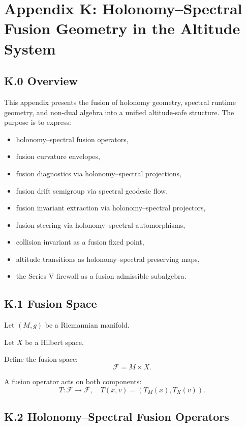 \appendix
\section*{Appendix K: Holonomy–Spectral Fusion Geometry in the Altitude System}

\subsection*{K.0 Overview}

This appendix presents the fusion of holonomy geometry, spectral runtime
geometry, and non-dual algebra into a unified altitude-safe structure.
The purpose is to express:
\begin{itemize}
    \item holonomy–spectral fusion operators,
    \item fusion curvature envelopes,
    \item fusion diagnostics via holonomy–spectral projections,
    \item fusion drift semigroup via spectral geodesic flow,
    \item fusion invariant extraction via holonomy–spectral projectors,
    \item fusion steering via holonomy–spectral automorphisms,
    \item collision invariant as a fusion fixed point,
    \item altitude transitions as holonomy–spectral preserving maps,
    \item the Series V firewall as a fusion admissible subalgebra.
\end{itemize}

\subsection*{K.1 Fusion Space}

Let $(M,g)$ be a Riemannian manifold.

Let $X$ be a Hilbert space.

Define the fusion space:
\[
\mathcal{F} = M \times X.
\]

A fusion operator acts on both components:
\[
T : \mathcal{F} \to \mathcal{F},\quad
T(x,v) = (T_M(x), T_X(v)).
\]

\subsection*{K.2 Holonomy–Spectral Fusion Operators}

